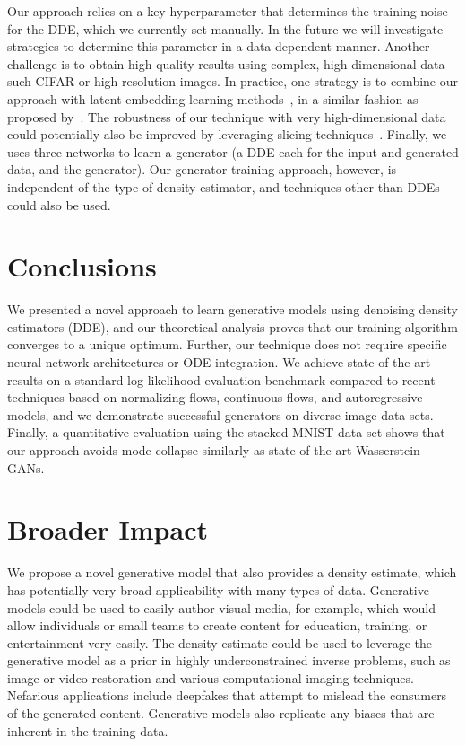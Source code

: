 \documentclass{article}
\begin{document}
Our approach relies on a key hyperparameter  that determines the training noise for the DDE, which we currently set manually. In the future we will investigate strategies to determine this parameter in a data-dependent manner. Another challenge is to obtain high-quality results using complex, high-dimensional data such CIFAR or high-resolution images. In practice, one strategy is to combine our approach with latent embedding learning methods~\citep{pmlr-v80-bojanowski18a}, in a similar fashion as proposed by~\citet{Hoshen_2019_CVPR}. The robustness of our technique with very high-dimensional data could potentially also be improved by leveraging slicing techniques~\citep{Song2019SSM,Wu_2019_CVPR}. Finally, we uses three networks to learn a generator (a DDE each for the input and generated data, and the generator). Our generator training approach, however, is independent of the type of density estimator, and techniques other than DDEs could also be used. 


\section{Conclusions}

We presented a novel approach to learn generative models using denoising density estimators (DDE), and our theoretical analysis proves that our training algorithm converges to a unique optimum.
Further, our technique 
does not require specific neural network architectures or ODE integration. We achieve state of the art results on a standard log-likelihood evaluation benchmark compared to recent techniques based on normalizing flows, continuous flows, and autoregressive models, and we demonstrate successful generators on diverse image data sets. Finally, a quantitative evaluation using the stacked MNIST data set shows that our approach avoids mode collapse similarly as state of the art Wasserstein GANs.



\section*{Broader Impact}

We propose a novel generative model that also provides a density estimate, which has potentially very broad applicability with many types of data. Generative models could be used to easily author visual media, for example, which would allow individuals or small teams to create content for education, training, or entertainment very easily. The density estimate could be used to leverage the generative model as a prior in highly underconstrained inverse problems, such as image or video restoration and various computational imaging techniques. Nefarious applications include deepfakes that attempt to mislead the consumers of the generated content. Generative models also replicate any biases that are inherent in the training data.


{\small
}
\end{document}
